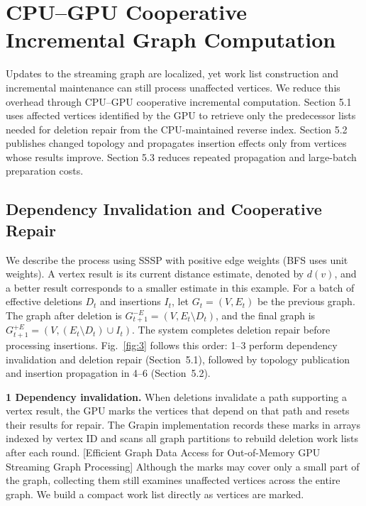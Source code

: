 
\section{CPU--GPU Cooperative Incremental Graph Computation}


Updates to the streaming graph are localized, yet work list construction and incremental maintenance can still process unaffected vertices. We reduce this overhead through CPU--GPU cooperative incremental computation. Section 5.1 uses affected vertices identified by the GPU to retrieve only the predecessor lists needed for deletion repair from the CPU-maintained reverse index. Section 5.2 publishes changed topology and propagates insertion effects only from vertices whose results improve. Section 5.3 reduces repeated propagation and large-batch preparation costs.

\subsection{Dependency Invalidation and Cooperative Repair}


We describe the process using SSSP with positive edge weights (BFS uses unit weights). A vertex result is its current distance estimate, denoted by $d(v)$, and a better result corresponds to a smaller estimate in this example. For a batch of effective deletions $D_t$ and insertions $I_t$, let $G_t=(V,E_t)$ be the previous graph. The graph after deletion is $G_{t+1}^{-E}=(V,E_t\setminus D_t)$, and the final graph is $G_{t+1}^{+E}=(V,(E_t\setminus D_t)\cup I_t)$. The system completes deletion repair before processing insertions. Fig.~\ref{fig:3} follows this order: 1--3 perform dependency invalidation and deletion repair (Section~5.1), followed by topology publication and insertion propagation in 4--6 (Section~5.2).

\textbf{1 Dependency invalidation.} When deletions invalidate a path supporting a vertex result, the GPU marks the vertices that depend on that path and resets their results for repair. The Grapin implementation records these marks in arrays indexed by vertex ID and scans all graph partitions to rebuild deletion work lists after each round. [Efficient Graph Data Access for Out-of-Memory GPU Streaming Graph Processing] Although the marks may cover only a small part of the graph, collecting them still examines unaffected vertices across the entire graph. We build a compact work list directly as vertices are marked.

